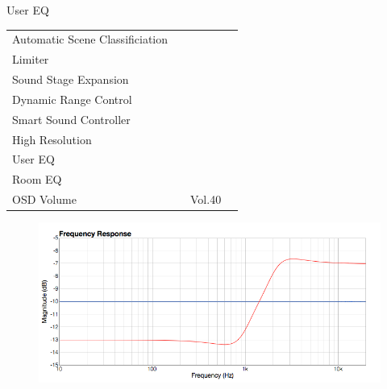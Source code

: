 \documentclass{beamer}
\begin{document}
\begin{frame}[t]{User EQ}
\begin{tiny}
\begin{tabular}{@{}lccc@{}}
Automatic Scene Classificiation & \color{black}{Off} & & \\
Limiter & \color{black}{Off} & & \\
Sound Stage Expansion & \color{black}{Off} & & \\
Dynamic Range Control & \color{black}{Off} & & \\
Smart Sound Controller & \color{black}{Off} & & \\
High Resolution & \color{black}{Off} & & \\
User EQ & \color{blue}{On} & & \\
Room EQ & \color{black}{Off} & & \\
OSD Volume & \color{blue}{On} & Vol.40 & \\
\midrule
\end{tabular}
\end{tiny}

\begin{figure}[b]
\includegraphics[height=0.32\textwidth]{figure/usereq.png}
\end{figure}

\end{frame}
\end{document}
